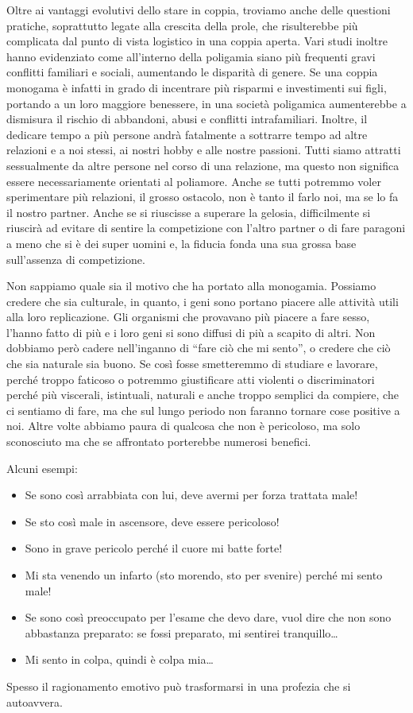 \documentclass[12pt]{book} %
\begin{document}
Oltre ai vantaggi evolutivi dello stare in coppia, troviamo anche delle questioni pratiche, soprattutto legate alla
crescita della prole, che risulterebbe più complicata dal punto di vista logistico in una coppia aperta. Vari studi
inoltre hanno evidenziato come all'interno della poligamia siano più frequenti gravi conflitti
familiari e sociali, aumentando le disparità di genere. Se una coppia monogama è infatti in grado di incentrare più
risparmi e investimenti sui figli, portando a un loro maggiore benessere, in una società poligamica aumenterebbe a
dismisura il rischio di abbandoni, abusi e conflitti intrafamiliari. Inoltre, il dedicare tempo a più persone andrà
fatalmente a sottrarre tempo ad altre relazioni e a noi stessi, ai nostri hobby e alle nostre passioni. Tutti siamo
attratti sessualmente da altre persone nel corso di una relazione, ma questo non significa essere necessariamente
orientati al poliamore. Anche se tutti potremmo voler sperimentare più relazioni, il grosso ostacolo, non è tanto il
farlo noi, ma se lo fa il nostro partner. Anche se si riuscisse a superare la gelosia, difficilmente si riuscirà ad
evitare di sentire la competizione con l'altro partner o di fare paragoni a meno che si è dei
super uomini e, la fiducia fonda una sua grossa base sull'assenza di competizione. 

Non sappiamo quale sia il motivo che ha portato alla monogamia. Possiamo credere che sia culturale, in quanto, i geni
sono portano piacere alle attività utili alla loro replicazione. Gli organismi che provavano più piacere a fare sesso,
l'hanno fatto di più e i loro geni si sono diffusi di più a scapito di altri. Non dobbiamo però
cadere nell'inganno di “fare ciò che mi sento”, o credere che ciò che sia naturale sia buono. Se
così fosse smetteremmo di studiare e lavorare, perché troppo faticoso o potremmo giustificare atti violenti o
discriminatori perché più viscerali, istintuali, naturali e anche troppo semplici da compiere, che ci sentiamo di fare,
ma che sul lungo periodo non faranno tornare cose positive a noi. Altre volte abbiamo paura di qualcosa che non è
pericoloso, ma solo sconosciuto ma che se affrontato porterebbe numerosi benefici. 

Alcuni esempi:

\begin{itemize}
\item Se sono così arrabbiata con lui, deve avermi per forza trattata male! 
\item Se sto così male in ascensore, deve essere pericoloso! 
\item Sono in grave pericolo perché il cuore mi batte forte! 
\item Mi sta venendo un infarto (sto morendo, sto per svenire) perché mi sento male! 
\item Se sono così preoccupato per l'esame che devo dare, vuol dire che non sono abbastanza preparato: se fossi
preparato, mi sentirei tranquillo…
\item Mi sento in colpa, quindi è colpa mia…
\end{itemize}
Spesso il ragionamento emotivo può trasformarsi in una profezia che si autoavvera. 
\end{document}
